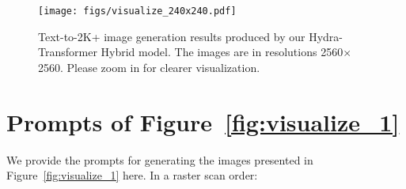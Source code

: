 \begin{figure*}[tp!]
  \centering
  \texttt{[image: figs/visualize\_240x240.pdf]}
  \vspace{-5pt}
  \caption{Text-to-2K+ image generation results produced by our Hydra-Transformer Hybrid model. The images are in resolutions 2560$\times$2560. Please zoom in for clearer visualization.}
  \label{fig:visualize_240x240}
\end{figure*}

\section{Prompts of Figure~\ref{fig:visualize_1}}

We provide the prompts for generating the images presented in Figure~\ref{fig:visualize_1} here. In a raster scan order: 

